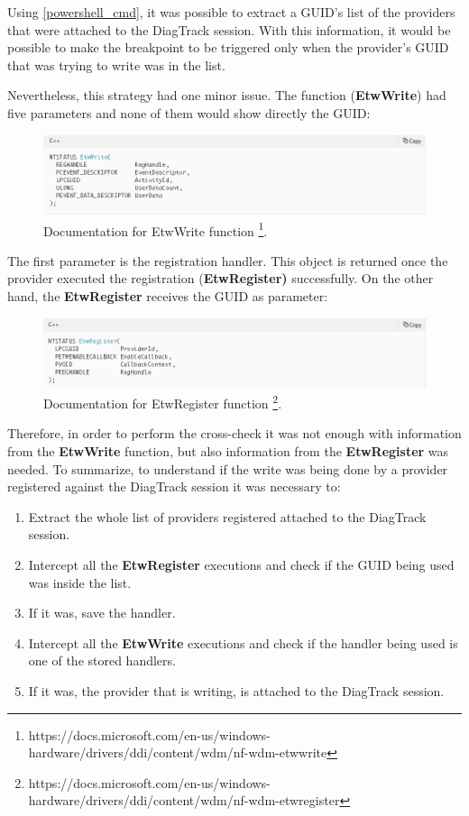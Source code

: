 Using \ref{powershell_cmd}, it was possible to extract a GUID's list of the providers that were attached to the DiagTrack session. With this information, it would be possible to make the breakpoint to be triggered only when the provider's GUID that was trying to write was in the list. 

Nevertheless, this strategy had one minor issue. The function ({\bfseries EtwWrite}) had five parameters and none of them would show directly the GUID:

\begin{figure}[H]
  \includegraphics[width=\linewidth]{images/etw_write_docu.png}
  \caption[]{Documentation for EtwWrite function \footnote{https://docs.microsoft.com/en-us/windows-hardware/drivers/ddi/content/wdm/nf-wdm-etwwrite}. }
  \label{fig:etw_write_docu}
\end{figure}

The first parameter is the registration handler. This object is returned once the provider executed the registration ({\bfseries EtwRegister)} successfully.
On the other hand, the {\bfseries EtwRegister} receives the GUID as parameter:
\begin{figure}[H]
  \includegraphics[width=\linewidth]{images/etw_register_docu.png}
  \caption[]{Documentation for EtwRegister function \footnote{https://docs.microsoft.com/en-us/windows-hardware/drivers/ddi/content/wdm/nf-wdm-etwregister}.}
  \label{fig:etw_register_docu}
\end{figure}

Therefore, in order to perform the cross-check it was not enough with information from the {\bfseries EtwWrite} function, but also information from the {\bfseries EtwRegister} was needed. To summarize, to understand if the write was being done by a provider registered against the DiagTrack session it was necessary to: 
\begin{enumerate}
    \item Extract the whole list of providers registered attached to the DiagTrack session.
    \item Intercept all the {\bfseries EtwRegister} executions and check if the GUID being used was inside the list.
    \item If it was, save the handler. 
    \item Intercept all the {\bfseries EtwWrite} executions and check if the handler being used is one of the stored handlers.
    \item If it was, the provider that is writing, is attached to the DiagTrack session.
\end{enumerate}

